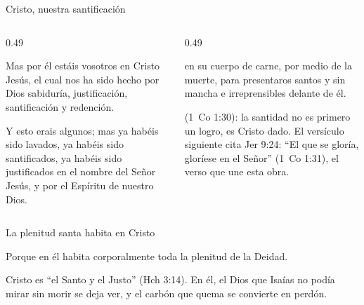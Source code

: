 \begin{frame}{Cristo, nuestra santificación}
\begin{columns}[t,onlytextwidth]
\begin{column}{0.49\textwidth}
\begin{cita}Mas por él estáis vosotros en Cristo Jesús, el cual nos ha sido hecho por Dios sabiduría, justificación, santificación y redención.\end{cita}
\begin{cita}Y esto erais algunos; mas ya habéis sido lavados, ya habéis sido santificados, ya habéis sido justificados en el nombre del Señor Jesús, y por el Espíritu de nuestro Dios.\end{cita}
\end{column}
\begin{column}{0.49\textwidth}
\begin{cita}en su cuerpo de carne, por medio de la muerte, para presentaros santos y sin mancha e irreprensibles delante de él.\end{cita}
\scriptsize{} (1~Co 1:30): la santidad no es primero un logro, es Cristo dado. El versículo siguiente cita Jer 9:24: ``El que se gloría, gloríese en el Señor'' (1~Co 1:31), el verso que une esta obra.\par\smallskip
{}
\end{column}
\end{columns}
\end{frame}

\begin{frame}{La plenitud santa habita en Cristo}
\begin{cita}Porque en él habita corporalmente toda la plenitud de la Deidad.\end{cita}
\centering
{}\par\medskip
\small\RaggedRight Cristo es ``el Santo y el Justo'' (Hch 3:14). En él, el Dios que Isaías no podía mirar sin morir se deja ver, y el carbón que quema se convierte en perdón.
\end{frame}

